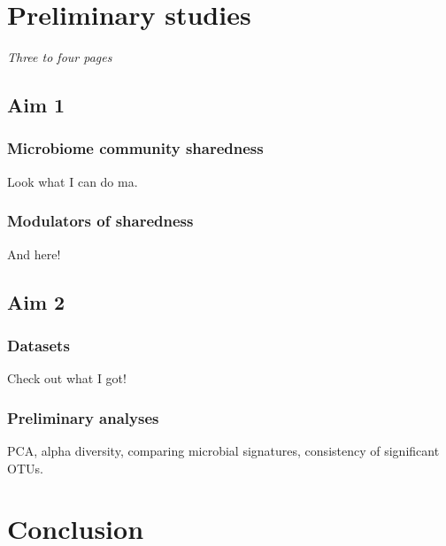 \documentclass[12pt]{article}
\begin{document}
\section*{Preliminary studies}
\textit{Three to four pages}

\subsection*{Aim 1}
\subsubsection*{Microbiome community sharedness}
Look what I can do ma.

\subsubsection*{Modulators of sharedness}
And here!

\subsection*{Aim 2}
\subsubsection*{Datasets}
Check out what I got!
\subsubsection*{Preliminary analyses}
PCA, alpha diversity, comparing microbial signatures, consistency of significant OTUs.

\section*{Conclusion}
\end{document}
